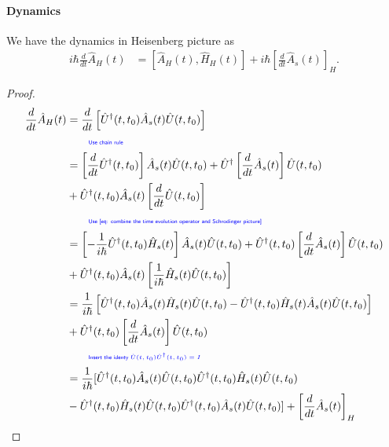 \documentclass[../../note.tex]{subfiles}
\begin{document}
\paragraph{Dynamics}
\begin{lemma}
    \label{lemma: dynamics}
    We have the dynamics in Heisenberg picture as
    \begin{align}
        i \hbar \frac{d}{d t} \hat{A}_H(t) 
        &= [\hat{A}_H(t), \hat{H}_H(t)] + i \hbar \left[\frac{d}{d t} \hat{A}_s(t) \right]_H.
    \end{align}
\end{lemma}
\begin{proof}
    \begin{align}
        \frac{d}{d t} \hat{A}_H(t)
        &= \frac{d}{d t} \left[\hat{U}^\dagger(t,t_0)\hat{A}_s(t) \hat{U}(t,t_0)\right] \\
        &\qquad\eqnote{Use chain rule} \nonumber \\
        &= \left[\frac{d}{d t} \hat{U}^\dagger(t,t_0)\right] \hat{A}_s(t) \hat{U}(t,t_0) + \hat{U}^\dagger \left[\frac{d}{d t }\hat{A}_s(t)\right] \hat{U}(t,t_0) \\
        &+ \hat{U}^\dagger(t,t_0) \hat{A}_s(t)\left[\frac{d}{d t} \hat{U}(t,t_0)\right] \\
        &\qquad\eqnote{Use \ref{eq: combine the time evolution operator and Schrodinger picture}} \nonumber \\
        &= \left[-\frac{1}{i \hbar} \hat{U}^\dagger(t,t_0) \hat{H}_s(t) \right] \hat{A}_s(t) \hat{U}(t,t_0) + \hat{U}^\dagger(t,t_0) \left[\frac{d}{d t }\hat{A}_s(t)\right] \hat{U}(t,t_0) \\
        &+ \hat{U}^\dagger(t,t_0) \hat{A}_s(t)\left[\frac{1}{i \hbar} \hat{H}_s(t)\hat{U}(t,t_0)\right] \\
        &= \frac{1}{i \hbar} \left[ \hat{U}^\dagger(t,t_0) \hat{A}_s(t) \hat{H}_s(t)\hat{U}(t,t_0)-  \hat{U}^\dagger(t,t_0) \hat{H}_s(t) \hat{A}_s(t) \hat{U}(t,t_0)\right] \\
        &+ \hat{U}^\dagger(t,t_0) \left[\frac{d}{d t }\hat{A}_s(t)\right] \hat{U}(t,t_0) \\
        &\qquad\eqnote{Insert the identy $\hat{U}(t,t_0) \hat{U}^\dagger(t,t_0) = I$} \nonumber \\
        &= \frac{1}{i \hbar} [ \hat{U}^\dagger(t,t_0) \hat{A}_s(t) \hat{U}(t,t_0) \hat{U}^\dagger(t,t_0) \hat{H}_s(t)\hat{U}(t,t_0)\\
        &-  \hat{U}^\dagger(t,t_0) \hat{H}_s(t) \hat{U}(t,t_0) \hat{U}^\dagger(t,t_0) \hat{A}_s(t) \hat{U}(t,t_0)] + \left[\frac{d}{d t }\hat{A}_s(t)\right]_H \\

\end{align}
\end{proof}
\end{document}
